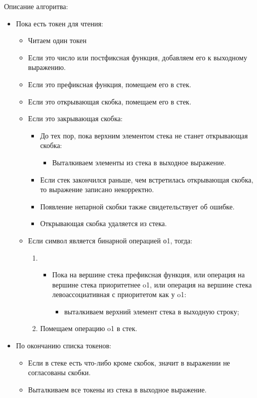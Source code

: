 \documentclass[12pt, a4paper]{article}
\begin{document}
  Описание алгоритва:
  \begin{itemize}
    \item Пока есть токен для чтения:
      \begin{itemize}
        \item Читаем один токен
        \item Если это число или постфиксная функция, добавляем его к выходному выражению.
        \item Если это префиксная функция, помещаем его в стек.
        \item Если это открывающая скобка, помещаем его в стек.
        \item Если это закрывающая скобка:
          \begin{itemize}
            \item До тех пор, пока верхним элементом стека не станет открывающая 
              скобка:
              \begin{itemize}
                \item Выталкиваем элементы из стека в выходное выражение. 
              \end{itemize}
            \item Если стек закончился раньше, чем встретилась открывающая 
              скобка, то выражение записано некорректно.
						\item Появление непарной скобки также свидетельствует об ошибке.
            \item Открывающая скобка удаляется из стека. 
          \end{itemize}
				\item Если символ является бинарной операцией о1, тогда:
					\begin{enumerate}
						\item
							\begin{itemize}
								\item Пока на вершине стека префиксная функция,
									или операция на вершине стека приоритетнее o1,
									или операция на вершине стека левоассоциативная с приоритетом как у o1:
									\begin{itemize}
										\item выталкиваем верхний элемент стека в выходную строку;
									\end{itemize}
							\end{itemize}
						\item Помещаем операцию o1 в стек.
					\end{enumerate}
      \end{itemize}
		\item По окончанию списка токенов:
			\begin{itemize}
				\item	Если в стеке есть что-либо кроме скобок, значит в выражении не согласованы скобки.
				\item Выталкиваем все токены из стека в выходное выражение. 
			\end{itemize}
	\end{itemize}
\end{document}

